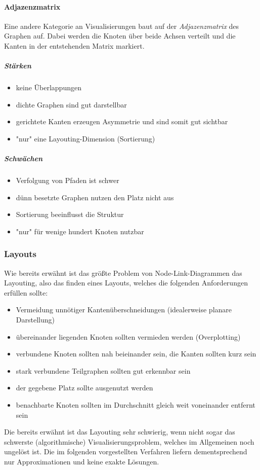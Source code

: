 			\paragraph{Adjazenzmatrix}
				Eine andere Kategorie an Visualisierungen baut auf der \emph{Adjazenzmatrix} des Graphen auf. Dabei werden die Knoten über beide Achsen verteilt und die Kanten in der entstehenden Matrix markiert.

				\subparagraph{Stärken}
				\begin{itemize}
					\item keine Überlappungen
					\item dichte Graphen sind gut darstellbar
					\item gerichtete Kanten erzeugen Asymmetrie und sind somit gut sichtbar
					\item "nur" eine Layouting-Dimension (Sortierung)
				\end{itemize}

				\subparagraph{Schwächen}
				\begin{itemize}
					\item Verfolgung von Pfaden ist schwer
					\item dünn besetzte Graphen nutzen den Platz nicht aus
					\item Sortierung beeinflusst die Struktur
					\item "nur" für wenige hundert Knoten nutzbar
				\end{itemize}

			\subsubsection{Layouts}
				Wie bereits erwähnt ist das größte Problem von Node-Link-Diagrammen das Layouting, also das finden eines Layouts, welches die folgenden Anforderungen erfüllen sollte:
				\begin{itemize}
					\item Vermeidung unnötiger Kantenüberschneidungen (idealerweise planare Darstellung)
					\item übereinander liegenden Knoten sollten vermieden werden (Overplotting)
					\item verbundene Knoten sollten nah beieinander sein, \dh die Kanten sollten kurz sein
					\item stark verbundene Teilgraphen sollten gut erkennbar sein
					\item der gegebene Platz sollte ausgenutzt werden
					\item benachbarte Knoten sollten im Durchschnitt gleich weit voneinander entfernt sein
				\end{itemize}
				Die bereits erwähnt ist das Layouting sehr schwierig, wenn nicht sogar das schwerste (algorithmische) Visualisierungsproblem, welches im Allgemeinen noch ungelöst ist. Die im folgenden vorgestellten Verfahren liefern dementsprechend nur Approximationen und keine exakte Lösungen.

